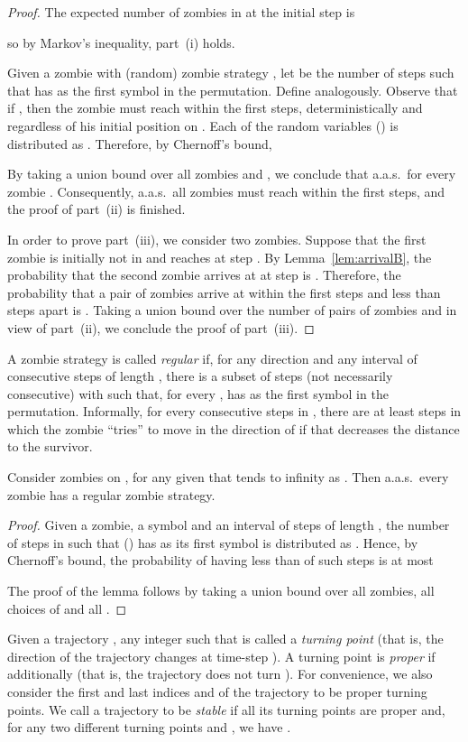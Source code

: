 \documentclass[12pt]{amsart}
\begin{document}
\begin{proof}
The expected number of zombies in  at the initial step is

so by Markov's inequality, part~(i) holds.

\bigskip

Given a zombie with (random) zombie strategy , let  be the number of steps  such that  has  as the first symbol in the permutation. Define
 analogously. Observe that if , then the zombie must reach  within the first  steps, deterministically and regardless of his initial position
on . Each of the random variables  () is distributed as . Therefore, by Chernoff's bound,

By taking a union bound over all zombies and , we conclude that a.a.s.\ for every zombie . Consequently, a.a.s.\ all zombies must reach
 within the first  steps, and the proof of part~(ii) is finished.

\bigskip

In order to prove part~(iii), we consider two zombies. Suppose that the first zombie is initially not in  and reaches  at step . By Lemma~\ref{lem:arrivalB}, the probability that
the second zombie arrives at  at step  is . Therefore, the probability that a pair of zombies arrive at  within the first  steps and less than
 steps apart is . Taking a union bound over the number  of pairs of zombies and in view of part~(ii), we conclude the proof of part~(iii).
\end{proof}
A zombie strategy  is called \emph{regular} if, for any direction  and any interval of consecutive steps  of length , there is a subset of
steps  (not necessarily consecutive) with  such that, for every ,  has  as the first symbol in the permutation. Informally, for every
 consecutive steps in , there are at least  steps in which the zombie ``tries'' to move in the direction of  if that decreases the distance to the survivor.
\begin{lemma}\label{lem:regulartorus}
Consider  zombies on , for any given  that tends to infinity as . Then a.a.s.\ every zombie has a regular zombie strategy.
\end{lemma}
\begin{proof}
Given a zombie, a symbol  and an interval of steps  of length , the number of steps   in  such that  () has  as its first
symbol is distributed as . Hence, by Chernoff's bound, the probability of having less than  of such steps is at most

The proof of the lemma follows by taking a union bound over all  zombies, all  choices of  and all .
\end{proof}
Given a trajectory , any integer  such that  is called a \emph{turning point} (that is, the direction of the trajectory changes at time-step
). A turning point  is \emph{proper} if additionally  (that is, the trajectory does not turn ). For convenience, we also consider the first and last
indices  and  of the trajectory to be proper turning points. We call a trajectory to be \emph{stable} if all its turning points are proper and, for any two different turning points  and
, we have .
\end{document}
